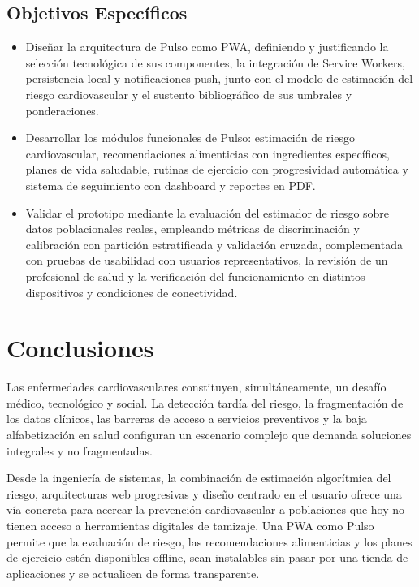 \documentclass[12pt,letterpaper]{article}
\begin{document}
\subsection{Objetivos Específicos}

\begin{itemize}
  \item Diseñar la arquitectura de Pulso como PWA, definiendo y justificando la
    selección tecnológica de sus componentes, la integración de Service Workers,
    persistencia local y notificaciones push, junto con el modelo de estimación
    del riesgo cardiovascular y el sustento bibliográfico de sus umbrales y
    ponderaciones.

  \item Desarrollar los módulos funcionales de Pulso: estimación de riesgo
    cardiovascular, recomendaciones alimenticias con ingredientes específicos,
    planes de vida saludable, rutinas de ejercicio con progresividad automática y
    sistema de seguimiento con dashboard y reportes en PDF.

  \item Validar el prototipo mediante la evaluación del estimador de riesgo sobre
    datos poblacionales reales, empleando métricas de discriminación y
    calibración con partición estratificada y validación cruzada, complementada
    con pruebas de usabilidad con usuarios representativos, la revisión de un
    profesional de salud y la verificación del funcionamiento en distintos
    dispositivos y condiciones de conectividad.
\end{itemize}

\newpage

\section{Conclusiones}

Las enfermedades cardiovasculares constituyen, simultáneamente, un desafío
médico, tecnológico y social. La detección tardía del riesgo, la fragmentación de
los datos clínicos, las barreras de acceso a servicios preventivos y la baja
alfabetización en salud configuran un escenario complejo que demanda soluciones
integrales y no fragmentadas.

Desde la ingeniería de sistemas, la combinación de estimación algorítmica del
riesgo, arquitecturas web progresivas y diseño centrado en el usuario ofrece una
vía concreta para acercar la prevención cardiovascular a poblaciones que hoy no
tienen acceso a herramientas digitales de tamizaje. Una PWA como Pulso permite
que la evaluación de riesgo, las recomendaciones alimenticias y los planes de
ejercicio estén disponibles offline, sean instalables sin pasar por una tienda de
aplicaciones y se actualicen de forma transparente.
\end{document}
